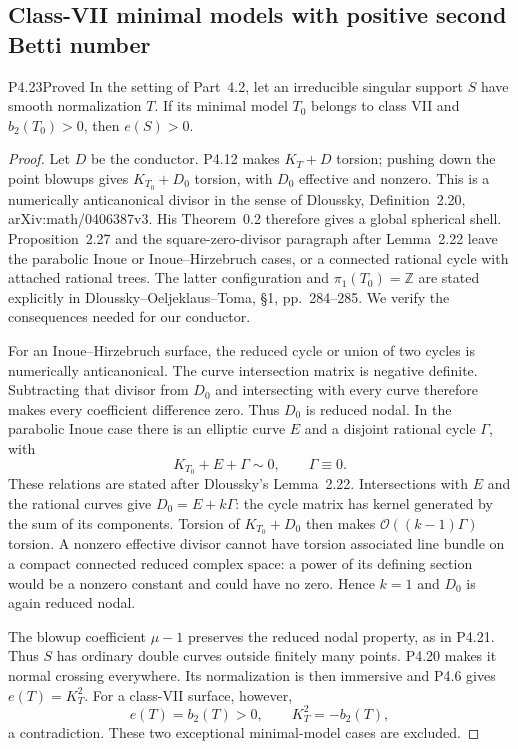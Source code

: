 \subsection{Class-VII minimal models with positive second Betti number}

\begin{statement}{P4.23}{Proved}
In the setting of Part~4.2, let an irreducible singular support
$S$ have smooth normalization $T$. If its minimal model $T_0$
belongs to class VII and $b_2(T_0)>0$, then $e(S)>0$.
\end{statement}
\begin{proof}
Let $D$ be the conductor. P4.12 makes $K_T+D$ torsion;
pushing down the point blowups gives $K_{T_0}+D_0$ torsion,
with $D_0$ effective and nonzero. This is a numerically
anticanonical divisor in the sense of Dloussky,
Definition~2.20, arXiv:math/0406387v3. His Theorem~0.2
therefore gives a global spherical shell. Proposition~2.27
and the square-zero-divisor paragraph after Lemma~2.22
leave the parabolic Inoue or Inoue--Hirzebruch cases,
or a connected rational cycle with attached rational
trees. The latter configuration and $\pi_1(T_0)=\mathbb Z$
are stated explicitly in Dloussky--Oeljeklaus--Toma,
\S1, pp.~284--285. We verify the consequences needed
for our conductor.

For an Inoue--Hirzebruch surface, the reduced cycle or
union of two cycles is numerically anticanonical. The
curve intersection matrix is negative definite. Subtracting
that divisor from $D_0$ and intersecting with every curve
therefore makes every coefficient difference zero.
Thus $D_0$ is reduced nodal. In the parabolic Inoue case
there is an elliptic curve $E$ and a disjoint rational
cycle $\Gamma$, with
\[
 K_{T_0}+E+\Gamma\sim0,\qquad \Gamma\equiv0.
\]
These relations are stated after Dloussky's Lemma~2.22.
Intersections with $E$ and the rational curves give
$D_0=E+k\Gamma$: the cycle matrix has kernel generated
by the sum of its components. Torsion of $K_{T_0}+D_0$
then makes $\mathcal O((k-1)\Gamma)$ torsion. A nonzero
effective divisor cannot have torsion associated line
bundle on a compact connected reduced complex space:
a power of its defining section would be a nonzero
constant and could have no zero. Hence $k=1$ and
$D_0$ is again reduced nodal.

The blowup coefficient $\mu-1$ preserves the reduced
nodal property, as in P4.21. Thus $S$ has ordinary
double curves outside finitely many points. P4.20
makes it normal crossing everywhere. Its normalization
is then immersive and P4.6 gives $e(T)=K_T^2$.
For a class-VII surface, however,
\[
 e(T)=b_2(T)>0,\qquad K_T^2=-b_2(T),
\]
a contradiction. These two exceptional minimal-model
cases are excluded.


\end{proof}
